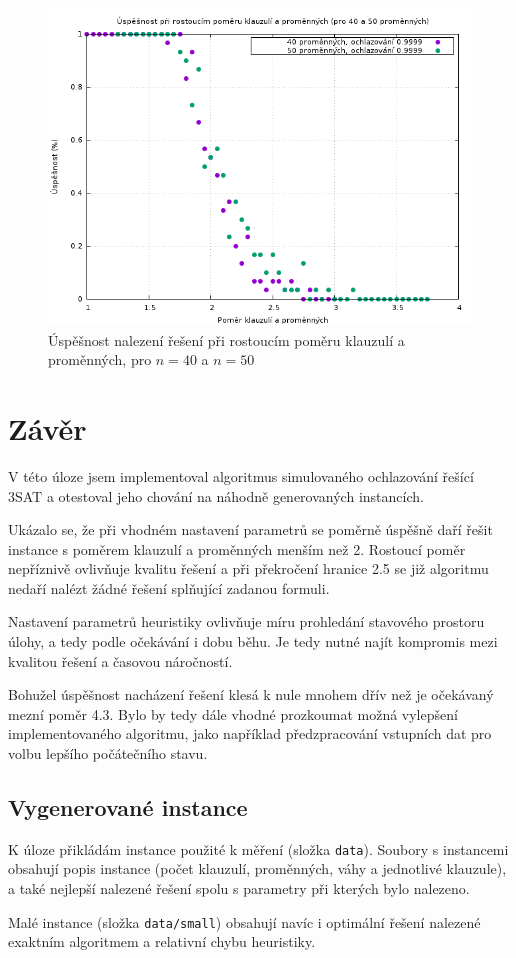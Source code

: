 \documentclass[11pt]{article}
\begin{document}
\begin{figure}[h!]
	\centering
	\includegraphics[width=\textwidth]{../grafy/40_success.png}
	\caption{Úspěšnost nalezení řešení při rostoucím poměru klauzulí a proměnných, pro $n = 40$ a $n = 50$}
	\label{fig:40_success}
\end{figure}

\section{Závěr}

V této úloze jsem implementoval algoritmus simulovaného ochlazování řešící 3SAT a otestoval jeho chování na náhodně generovaných instancích.

Ukázalo se, že při vhodném nastavení parametrů se poměrně úspěšně daří řešit instance s poměrem klauzulí a proměnných menším než 2. Rostoucí poměr nepříznivě ovlivňuje kvalitu řešení a při překročení hranice 2.5 se již algoritmu nedaří nalézt žádné řešení splňující zadanou formuli.

Nastavení parametrů heuristiky ovlivňuje míru prohledání stavového prostoru úlohy, a tedy podle očekávání i dobu běhu. Je tedy nutné najít kompromis mezi kvalitou řešení a časovou náročností.

Bohužel úspěšnost nacházení řešení klesá k nule mnohem dřív než je očekávaný mezní poměr 4.3\cite{selman}. Bylo by tedy dále vhodné prozkoumat možná vylepšení implementovaného algoritmu, jako například předzpracování vstupních dat pro volbu lepšího počátečního stavu.

\subsection{Vygenerované instance}

K úloze přikládám instance použité k měření (složka \verb|data|). Soubory s instancemi obsahují popis instance (počet klauzulí, proměnných, váhy a jednotlivé klauzule), a také nejlepší nalezené řešení spolu s parametry při kterých bylo nalezeno.

Malé instance (složka \verb|data/small|) obsahují navíc i optimální řešení nalezené exaktním algoritmem a relativní chybu heuristiky.



\end{document}

